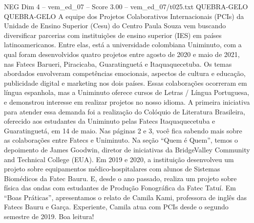 \begin{textsample}{NEG Dim 4 – vem\_ed\_07 – Score 3.00 – vem\_ed\_07/t025.txt}  \label{ex:f4_neg_127}
QUEBRA-GELO QUEBRA-GELO A equipe dos Projetos Colaborativos Internacionais (PCIs) da Unidade de Ensino Superior (Cesu) do Centro Paula Souza vem buscando diversificar parcerias com instituições de ensino superior (IES) em países latinoamericanos.
Entre elas, está a universidade colombiana Uniminuto, com a qual foram desenvolvidos quatro projetos entre agosto de 2020 e maio de 2021, nas Fatecs Barueri, Piracicaba, Guaratinguetá e Itaquaquecetuba.
Os temas abordados envolveram competências emocionais, aspectos de cultura e educação, publicidade digital e marketing nos dois países.
Essas colaborações ocorreram em língua espanhola, mas a Uniminuto oferece cursos de Letras / Língua Portuguesa, e demonstrou interesse em realizar projetos no nosso idioma.
A primeira iniciativa para atender essa demanda foi a realização do Colóquio de Literatura Brasileira, oferecido aos estudantes da Uniminuto pelas Fatecs Itaquaquecetuba e Guaratinguetá, em 14 de maio.
Nas páginas 2 e 3, você fica sabendo mais sobre as colaborações entre Fatecs e Uniminuto.
Na seção “Quem é Quem”, temos o depoimento de James Goodwin, diretor de iniciativas da BridgeValley Community and Technical College (EUA).
Em 2019 e 2020, a instituição desenvolveu um projeto sobre equipamentos médico-hospitalares com alunos de Sistemas Biomédicos da Fatec Bauru.
E, desde o ano passado, realiza um projeto sobre física das ondas com estudantes de Produção Fonográfica da Fatec Tatuí.
Em “Boas Práticas”, apresentamos o relato de Camila Kami, professora de inglês das Fatecs Bauru e Garça.
Experiente, Camila atua com PCIs desde o segundo semestre de 2019.
Boa leitura!

\end{textsample}
